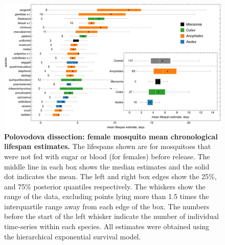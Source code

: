 \documentclass[12pt]{article}
\begin{document}
\begin{figure}[h]
	\centerline{\includegraphics[width=1\textwidth]{./Figure_files/dissection_lifetimes_exponential_chron.pdf}}
	\caption{\textbf{Polovodova dissection: female mosquito mean chronological lifespan estimates.} The lifespans shown are for mosquitoes that were not fed with sugar or blood (for females) before release. The middle line in each box shows the median estimates and the solid dot indicates the mean. The left and right box edges show the 25\%, and 75\% posterior quantiles respectively. The whiskers show the range of the data, excluding points lying more than 1.5 times the interquartile range away from each edge of the box. The numbers before the start of the left whisker indicate the number of individual time-series within each species. All estimates were obtained using the hierarchical exponential survival model.}
	\label{fig:dissection_lifetimes_exponential_chron}
\end{figure}
\end{document}
